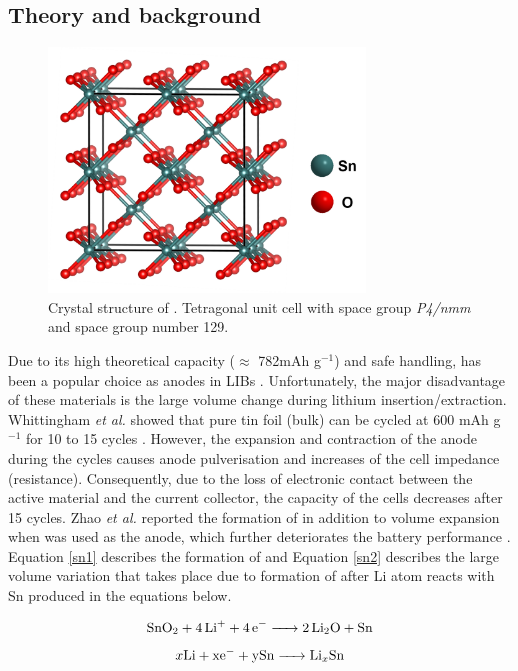 \subsection{Theory and background}
\begin{figure}[th!]
  \centering
  \includegraphics[width=0.75\textwidth]{Figures/chap6fig/SnO2crys}
    \caption{Crystal structure of . Tetragonal unit cell with space group \textit{P4/nmm} and space group number 129.}
  \label{Figures/chap6fig:SnO2crys}
  \end{figure}
Due to its high theoretical capacity ($\approx$ 782mAh g$^{-1}$) and safe handling,  has been a popular choice as anodes in LIBs \cite{idota_tin-based_1997}. Unfortunately, the major disadvantage of these materials is the large volume change during lithium insertion/extraction. Whittingham \textit{et al.} showed that pure tin foil (bulk) can be cycled at 600 mAh g$^{-1}$ for 10 to 15 cycles \cite{yang_anodes_2003}. However, the expansion and contraction of the anode during the cycles causes anode pulverisation and increases of the cell impedance (resistance). Consequently, due to the loss of electronic contact between the active material and the current collector, the capacity of the cells decreases after 15 cycles. Zhao \textit{et al.} reported the formation of  in addition to volume expansion when  was used as the anode, which further deteriorates the battery performance \cite{zhao_tin-based_2016}. Equation \ref{sn1} describes the formation of  and Equation \ref{sn2} describes the large volume variation that takes place due to formation of  after Li atom reacts with Sn produced in the equations below.

\begin{equation}\label{sn1}
\ce{SnO2 + 4Li+ + 4e- -> 2Li2O + Sn} 
\end{equation}
\begin{equation}\label{sn2}
x\ce{Li + xe- + ySn -> Li_{x}Sn} 
\end{equation}

